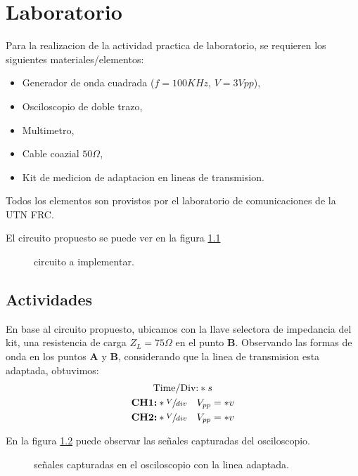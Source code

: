 \chapter{Laboratorio}
  Para la realizacion de la actividad practica de laboratorio, se requieren los siguientes materiales/elementos:
  \begin{itemize}
    \item Generador de onda cuadrada ($f = 100KHz$, $V = 3Vpp$),
    \item Osciloscopio de doble trazo,
    \item Multimetro,
    \item Cable coazial $50 \Omega$,
    \item Kit de medicion de adaptacion en lineas de transmision.
  \end{itemize}

  Todos los elementos son provistos por el laboratorio de comunicaciones de la UTN FRC.

  El circuito propuesto se puede ver en la figura \ref{fig:crkt}

  \begin{figure}[!ht]
    \centering
    
    \caption{circuito a implementar.}
    \label{fig:crkt}
  \end{figure}
  
  \section{Actividades}
    En base al circuito propuesto, ubicamos con la llave selectora de impedancia del kit, una resistencia de carga
    $Z_L = 75 \Omega$ en el punto \textbf{B}. Observando las formas de onda en los puntos \textbf{A} y \textbf{B},
    considerando que la linea de transmision esta adaptada, obtuvimos:
    \begin{gather*}
      \text{Time/Div:} *s \\
      \text{\textbf{CH1:}} *\sfrac{V}{div} \quad V_{pp} = *v \\
      \text{\textbf{CH2:}} *\sfrac{V}{div} \quad V_{pp} = *v
    \end{gather*}

    En la figura \ref{fig:sig_plot1} puede observar las señales capturadas del osciloscopio.
    \begin{figure}[!ht]
      \centering
      \caption{señales capturadas en el osciloscopio con la linea adaptada.}
      \label{fig:sig_plot1}
    \end{figure}

